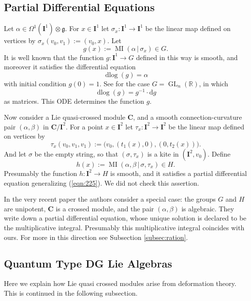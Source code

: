 \documentclass[10pt, a4paper]{amsart}
\theoremstyle{definition}
\numberwithin{equation}{section}
\newcommand{\opn}{\operatorname}
\newcommand{\mfrak}[1]{\mathfrak{#1}}
\newcommand{\mbf}[1]{\mathbf{#1}}
\newcommand{\mrm}[1]{\mathrm{#1}}
\newcommand{\mbb}[1]{\mathbb{#1}}
\renewcommand{\vert}{\, | \,}
\newcommand{\R}{\mbb{R}}
\newcommand{\g}{\mfrak{g}}
\renewcommand{\d}{\mrm{d}}
\begin{document}
\subsection{Partial Differential Equations} \label{subsec:PDEs}
Let $\alpha \in \Omega^1(\mbf{I}^1) \otimes \g$. 
For $x \in \mbf{I}^1$ let $\sigma_x : \mbf{I}^1 \to \mbf{I}^1$
be the linear map defined on vertices by 
$\sigma_x(v_0, v_1) := (v_0, x)$.
Let
\begin{equation} \label{eqn:252}
g(x) := \opn{MI}(\alpha \vert \sigma_x) \in G .
\end{equation}
It is well known  that the function 
$g : \mbf{I}^1 \to G$ defined in this way is smooth, and moreover it satisfies
the differential equation
\begin{equation} \label{eqn:225}
\opn{dlog}(g) = \alpha
\end{equation}
with initial condition $g(0) = 1$.
See \cite{DF} for the case $G = \opn{GL}_n(\R)$, in which 
\[ \opn{dlog}(g) = g^{-1} \cdot \d g \]
as matrices. This ODE determines the function $g$. 

Now consider a Lie quasi-crossed module $\mbf{C}$, and a smooth
connection-cur\-vature
pair $(\alpha, \beta)$ in $\mbf{C} / \mbf{I}^2$. 
For a point $x \in \mbf{I}^2$ let 
$\tau_{x} : \mbf{I}^2 \to \mbf{I}^2$ be the linear map
defined on vertices by 
\[ \tau_x(v_0, v_1, v_1) := \bigl( v_0, (t_1(x), 0), (0, t_2(x)) \bigr) . \]
And let $\sigma$ be the empty string, so that 
$(\sigma, \tau_x)$ is a kite in $(\mbf{I}^2, v_0)$. Define
\[ h(x) := \opn{MI}(\alpha, \beta \vert \sigma, \tau_x) \in H . \]
Presumably the function 
$h : \mbf{I}^2 \to H$
is smooth, and it satisfies a partial differential equation generalizing 
(\ref{eqn:225}). We did not check this assertion.

In the very recent paper \cite{BGNT} the authors consider a special case:
the groups $G$ and $H$ are unipotent, $\mbf{C}$ is a crossed module, and the
pair $(\alpha, \beta)$ is algebraic. They write down a partial
differential equation, whose unique solution is declared to be the
multiplicative integral. Presumably this multiplicative integral coincides with
ours. For more in this direction see Subsection \ref{subsec:ration}.


\subsection{Quantum Type DG Lie Algebras} \label{subsec:QTDGLie}
Here we explain how Lie quasi crossed modules arise
from deformation theory. This is continued in the following subsection.
\end{document}
